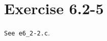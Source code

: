 \documentclass{article}
\begin{document}
\section*{Exercise 6.2-5}

\texttt{See e6\_2-2.c}.
\end{document}
